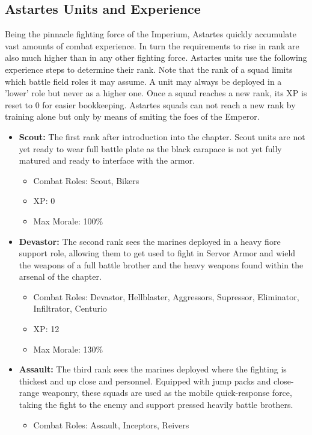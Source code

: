 \subsection{Astartes Units and Experience}
Being the pinnacle fighting force of the Imperium, Astartes quickly accumulate vast amounts of combat experience. 
In turn the requirements to rise in rank are also much higher than in any other fighting force. 
Astartes units use the following experience steps to determine their rank. 
Note that the rank of a squad limits which battle field roles it may assume. A unit may always be deployed in a 'lower' role but never as a higher one.
Once a squad reaches a new rank, its XP is reset to 0 for easier bookkeeping.
Astartes squads can not reach a new rank by training alone but only by means of smiting the foes of the Emperor.
\begin{itemize}
	\item \textbf{Scout:} The first rank after introduction into the chapter. Scout units are not yet ready to wear full battle plate as the black carapace is not yet fully matured and ready to interface with the armor.
	\begin{itemize}
		\item Combat Roles: Scout, Bikers
		\item XP: 0
		\item Max Morale: 100\%
	\end{itemize}
	\item \textbf{Devastor:} The second rank sees the marines deployed in a heavy fiore support role, allowing them to get used to fight in Servor Armor and wield the weapons of a full battle brother and the heavy weapons found within the arsenal of the chapter. 
	\begin{itemize}
		\item Combat Roles: Devastor, Hellblaster, Aggressors, Supressor, Eliminator, Infiltrator, Centurio
		\item XP: 12
		\item Max Morale: 130\%
	\end{itemize}
	\item \textbf{Assault:} The third rank sees the marines deployed where the fighting is thickest and up close and personnel. Equipped with jump packs and close-range weaponry, these squads are used as the mobile quick-response force, taking the fight to the enemy and support pressed heavily battle brothers. 
	\begin{itemize}
		\item Combat Roles: Assault, Inceptors, Reivers

\end{itemize}
\end{itemize}
